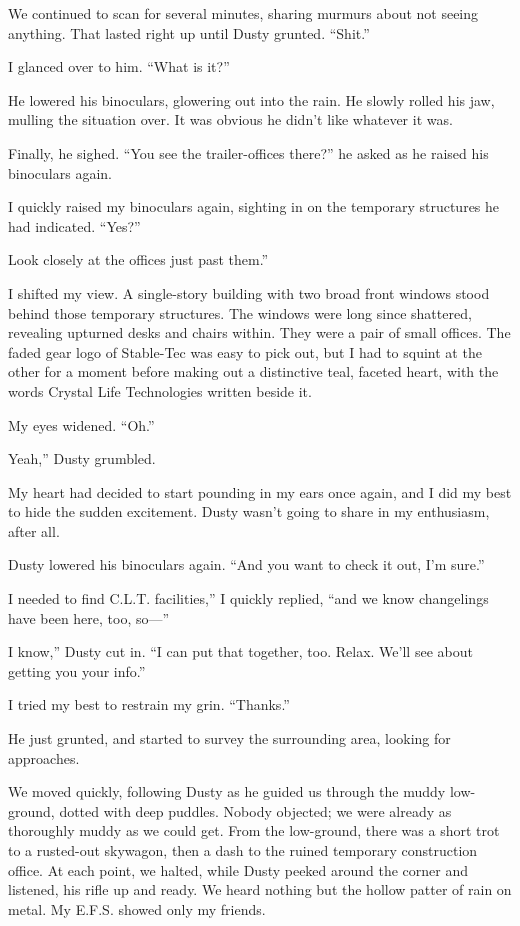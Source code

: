 We continued to scan for several minutes, sharing murmurs about not seeing anything. That lasted right up until Dusty grunted. “Shit.”

I glanced over to him. “What is it?”

He lowered his binoculars, glowering out into the rain. He slowly rolled his jaw, mulling the situation over. It was obvious he didn’t like whatever it was.

Finally, he sighed. “You see the trailer-offices there?” he asked as he raised his binoculars again.

I quickly raised my binoculars again, sighting in on the temporary structures he had indicated. “Yes?”

\leavevmode{}Look closely at the offices just past them.”

I shifted my view. A single-story building with two broad front windows stood behind those temporary structures. The windows were long since shattered, revealing upturned desks and chairs within. They were a pair of small offices. The faded gear logo of Stable-Tec was easy to pick out, but I had to squint at the other for a moment before making out a distinctive teal, faceted heart, with the words Crystal Life Technologies written beside it.

My eyes widened. “Oh.”

\leavevmode{}Yeah,” Dusty grumbled.

My heart had decided to start pounding in my ears once again, and I did my best to hide the sudden excitement. Dusty wasn’t going to share in my enthusiasm, after all.

Dusty lowered his binoculars again. “And you want to check it out, I’m sure.”

\leavevmode{}I needed to find C.L.T. facilities,” I quickly replied, “and we know changelings have been here, too, so—”

\leavevmode{}I know,” Dusty cut in. “I can put that together, too. Relax. We’ll see about getting you your info.”

I tried my best to restrain my grin. “Thanks.”

He just grunted, and started to survey the surrounding area, looking for approaches.

We moved quickly, following Dusty as he guided us through the muddy low-ground, dotted with deep puddles. Nobody objected; we were already as thoroughly muddy as we could get. From the low-ground, there was a short trot to a rusted-out skywagon, then a dash to the ruined temporary construction office. At each point, we halted, while Dusty peeked around the corner and listened, his rifle up and ready. We heard nothing but the hollow patter of rain on metal. My E.F.S. showed only my friends.

